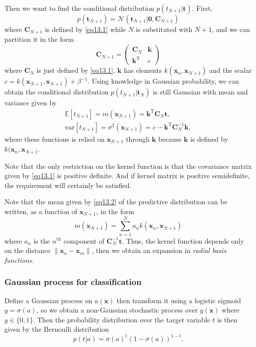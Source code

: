 \documentclass[a4paper]{book}
\newcommand{\normD}{\mathcal{N}}
\newcommand{\mrm}{\mathrm}
\newcommand{\mbf}{\mathbf}
\newcommand{\CC}{\mbf C}
\newcommand{\kk}{\mbf k}
\newcommand{\ttt}{\mbf t}
\newcommand{\xx}{\mbf x}
\newcommand{\bmz}{\bm{0}}
\newcommand{\Exp}{\mathbb{E}}
\newcommand{\rev}{^{-1}}
\newcommand{\trans}{^{\mrm T}}
\begin{document}
Then we want to find the conditional distribution $p(t_{N+1}|\ttt)$. First,
\begin{equation}
    p(\ttt_{N+1}) = \normD(\ttt_{N+1}|\bmz, \CC_{N+1})
\end{equation}
where $\CC_{N+1}$ is defined by \ref{eq13.1} while $N$ is substituted with $N+1$, and we can partition it in the form
\begin{equation}
    \CC_{N+1}=\left(\begin{array}{cc}
         \CC_N & \kk  \\
         \kk\trans & c
    \end{array}\right)
\end{equation}
where $\CC_N$ is just defined by \ref{eq13.1}, $\kk$ has elements $k(\xx_n,\xx_{N+1})$ and the scalar $c = k(\xx_{N+1},\xx_{N+1})+\beta\rev$.
Using knowledge in Gaussian probability, we can obtain the conditional distribution $p(t_{N+1}|\ttt_N)$ is still Gaussian with mean and variance given by
\begin{gather}\label{eq13.2}
    \Exp[t_{N+1}] = m(\xx_{N+1})=\kk\trans\CC_N\ttt, \\
    \mrm{var}[t_{N+1}] = \sigma^2(\xx_{N+1})=c-\kk\trans\CC_N\rev\kk,
\end{gather}
where these functions is relied on $\xx_{N+1}$ through $\kk$ because $\kk$ is defined by $k(\xx_n,\xx_{N+1}$.

Note that the only restriction on the kernel function is that the covariance matrix given by  \ref{eq13.1} is positive definite. And if kernel matrix is positive semidefinite, the requirement will certainly be satisfied.

Note that the mean given by \ref{eq13.2} of the predictive distribution can be written, as a function of $\xx_{N+1}$, in the form
\begin{equation}
    m(\xx_{N+1})=\sum_{n=1}^Na_nk(\xx_n, \xx_{N+1})
\end{equation}
where $a_n$ is the $n^{\mrm{th}}$ component of $\CC_N\rev\ttt$. Thus, the kernel function depends only on the distance $\|\xx_n-\xx_m\|$, then we obtain an expansion in \emph{radial basis functions}.

\subsubsection*{Gaussian process for classification}
Define a Gaussian process on $a(\xx)$ then transform it using a logistic sigmoid $y=\sigma(a)$, so we obtain a non-Gaussian stochastic process over $y(\xx)$ where $y\in\{0,1\}$. Then the probability distribution over the target variable $t$ is then given by the Bernoulli distribution
\begin{equation}
    p(t|a)=\sigma(a)^t(1-\sigma(a))^{1-t}.
\end{equation}
\end{document}
